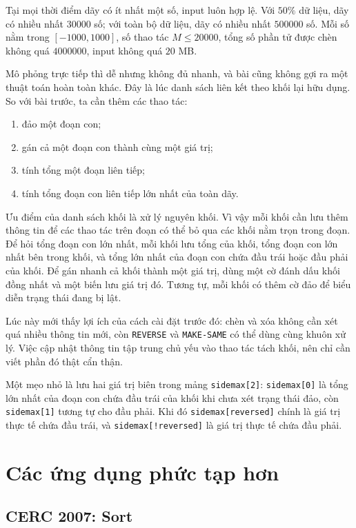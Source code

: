 \documentclass[11pt]{article}
\begin{document}
Tại mọi thời điểm dãy có ít nhất một số, input luôn hợp lệ. Với \(50\%\) dữ
liệu, dãy có nhiều nhất \(30000\) số; với toàn bộ dữ liệu, dãy có nhiều nhất
\(500000\) số. Mỗi số nằm trong \([-1000,1000]\), số thao tác \(M\le 20000\),
tổng số phần tử được chèn không quá \(4000000\), input không quá \(20\) MB.

Mô phỏng trực tiếp thì dễ nhưng không đủ nhanh, và bài cũng không gợi ra một
thuật toán hoàn toàn khác. Đây là lúc danh sách liên kết theo khối lại hữu
dụng. So với bài trước, ta cần thêm các thao tác:
\begin{enumerate}
  \item đảo một đoạn con;
  \item gán cả một đoạn con thành cùng một giá trị;
  \item tính tổng một đoạn liên tiếp;
  \item tính tổng đoạn con liên tiếp lớn nhất của toàn dãy.
\end{enumerate}

Ưu điểm của danh sách khối là xử lý nguyên khối. Vì vậy mỗi khối cần lưu thêm
thông tin để các thao tác trên đoạn có thể bỏ qua các khối nằm trọn trong
đoạn. Để hỏi tổng đoạn con lớn nhất, mỗi khối lưu tổng của khối, tổng đoạn con
lớn nhất bên trong khối, và tổng lớn nhất của đoạn con chứa đầu trái hoặc đầu
phải của khối. Để gán nhanh cả khối thành một giá trị, dùng một cờ đánh dấu
khối đồng nhất và một biến lưu giá trị đó. Tương tự, mỗi khối có thêm cờ đảo
để biểu diễn trạng thái đang bị lật.

Lúc này mới thấy lợi ích của cách cài đặt trước đó: chèn và xóa không cần xét
quá nhiều thông tin mới, còn \texttt{REVERSE} và \texttt{MAKE-SAME} có thể
dùng cùng khuôn xử lý. Việc cập nhật thông tin tập trung chủ yếu vào thao tác
tách khối, nên chỉ cần viết phần đó thật cẩn thận.

Một mẹo nhỏ là lưu hai giá trị biên trong mảng \texttt{sidemax[2]}:
\texttt{sidemax[0]} là tổng lớn nhất của đoạn con chứa đầu trái của khối khi
chưa xét trạng thái đảo, còn \texttt{sidemax[1]} tương tự cho đầu phải. Khi
đó \texttt{sidemax[reversed]} chính là giá trị thực tế chứa đầu trái, và
\texttt{sidemax[!reversed]} là giá trị thực tế chứa đầu phải.

\section{Các ứng dụng phức tạp hơn}

\subsection{CERC 2007: Sort}
\end{document}
